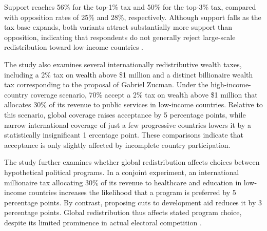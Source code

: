 Support reaches 56\% for the top-1\% tax and 50\% for the top-3\% tax, compared with opposition rates of 25\% and 28\%, respectively. Although support falls as the tax base expands, both variants attract substantially more support than opposition, indicating that respondents do not generally reject large-scale redistribution toward low-income countries \citep{fabre_public_2026}. %

The study also examines several internationally redistributive wealth taxes, including a 2\% tax on wealth above \$1 million and a distinct billionaire wealth tax corresponding %
to the proposal of %
Gabriel Zucman. %
Under the high-income-country coverage scenario, %
70\% accept a 2\% tax on wealth above \$1 million that allocates 30\% of its revenue to public services in low-income countries. Relative to this scenario, global coverage raises acceptance by 5 %
percentage points, while narrow %
international coverage of just a few progressive countries 
lowers it by a statistically insignificant 1 %
ercentage point. These comparisons indicate that acceptance is only slightly affected by %
incomplete country participation. %

The study further examines whether global redistribution affects choices between hypothetical political programs. In a conjoint experiment, an international millionaire tax allocating 30\% of its revenue to healthcare and education in low-income countries increases the likelihood that a program is preferred %
by 5 percentage points. By contrast, proposing cuts to development aid reduces it %
by 3 percentage points. Global redistribution thus affects stated program choice, despite its limited prominence in actual electoral competition \citep{fabre_public_2026}. 

